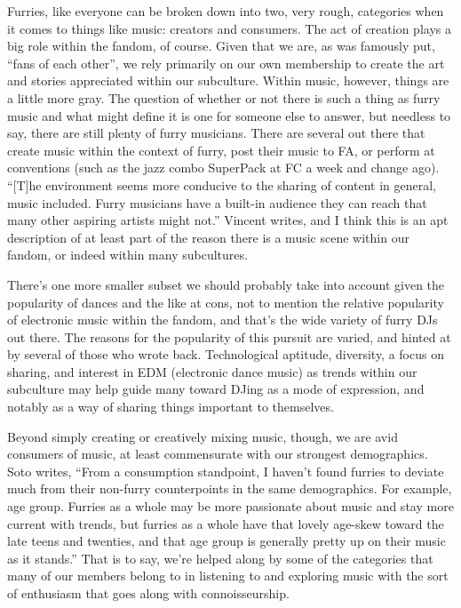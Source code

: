 Furries, like everyone can be broken down into two, very rough, categories when it comes to things like music: creators and consumers. The act of creation plays a big role within the fandom, of course. Given that we are, as was famously put, ``fans of each other'', we rely primarily on our own membership to create the art and stories appreciated within our subculture. Within music, however, things are a little more gray. The question of whether or not there is such a thing as furry music and what might define it is one for someone else to answer, but needless to say, there are still plenty of furry musicians. There are several out there that create music within the context of furry, post their music to FA, or perform at conventions (such as the jazz combo SuperPack at FC a week and change ago). ``[T]he environment seems more conducive to the sharing of content in general, music included. Furry musicians have a built-in audience they can reach that many other aspiring artists might not.'' Vincent writes, and I think this is an apt description of at least part of the reason there is a music scene within our fandom, or indeed within many subcultures.

There's one more smaller subset we should probably take into account given the popularity of dances and the like at cons, not to mention the relative popularity of electronic music within the fandom, and that's the wide variety of furry DJs out there. The reasons for the popularity of this pursuit are varied, and hinted at by several of those who wrote back. Technological aptitude, diversity, a focus on sharing, and interest in EDM (electronic dance music) as trends within our subculture may help guide many toward DJing as a mode of expression, and notably as a way of sharing things important to themselves.

Beyond simply creating or creatively mixing music, though, we are avid consumers of music, at least commensurate with our strongest demographics. Soto writes, ``From a consumption standpoint, I haven't found furries to deviate much from their non-furry counterpoints in the same demographics. For example, age group. Furries as a whole may be more passionate about music and stay more current with trends, but furries as a whole have that lovely age-skew toward the late teens and twenties, and that age group is generally pretty up on their music as it stands.'' That is to say, we're helped along by some of the categories that many of our members belong to in listening to and exploring music with the sort of enthusiasm that goes along with connoisseurship.

